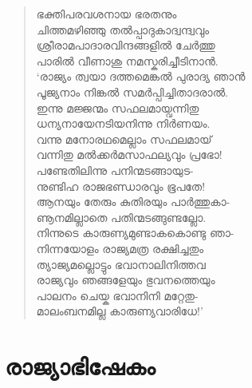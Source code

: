\begin{verse}
ഭക്തിപരവശനായ ഭരതനും\\
ചിത്തമഴിഞ്ഞു തല്‍പ്പാദുകാദ്വന്ദ്വവും\\
ശ്രീരാമപാദാരവിന്ദങ്ങളില്‍ ചേര്‍ത്തു\\
പാരില്‍ വീണാശു നമസ്കരിച്ചീടിനാന്‍.\\
‘രാജ്യം ത്വയാ ദത്തമെങ്കല്‍ പുരാദ്യ ഞാന്‍\\
പൂജ്യനാം നിങ്കല്‍ സമര്‍പ്പിച്ചിതാദരാല്‍.\\
ഇന്നു മജ്ജന്മം സഫലമായ്വന്നിതു\\
ധന്യനായേനടിയനിന്നു നിര്‍ണയം.\\
വന്നു മനോരഥമെല്ലാം സഫലമായ്\\
വന്നിതു മല്‍ക്കര്‍മസാഫല്യവും പ്രഭോ!\\
പണ്ടേതിലിന്നു പനിന്മടങ്ങായുട-\\
നുണ്ടിഹ രാജഭണ്ഡാരവും ഭൂപതേ!\\
ആനയും തേരും കുതിരയും പാര്‍ത്തുകാ-\\
ണൂനമില്ലാതെ പതിന്മടങ്ങുണ്ടല്ലോ.\\
നിന്നുടെ കാരുണ്യമുണ്ടാകകൊണ്ടു ഞാ-\\
നിന്നയോളം രാജ്യമത്ര രക്ഷിച്ചതും\\
ത്യാജ്യമല്ലൊട്ടും ഭവാനാലിനിത്തവ\\
രാജ്യവും ഞങ്ങളേയും ഭുവനത്തെയും\\
പാലനം ചെയ്ക ഭവാനിനി മറ്റേതു-\\
മാലംബനമില്ല കാരുണ്യവാരിധേ!’
\end{verse}


\section{രാജ്യാഭിഷേകം}

